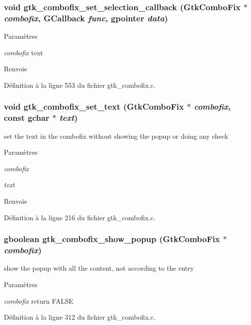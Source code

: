 \subsubsection[{gtk\_\-combofix\_\-set\_\-selection\_\-callback}]{\setlength{\rightskip}{0pt plus 5cm}void gtk\_\-combofix\_\-set\_\-selection\_\-callback ({\bf GtkComboFix} $\ast$ {\em combofix}, \/  GCallback {\em func}, \/  gpointer {\em data})}\label{gtk__combofix_8h_aaaedc2affe02e18b822ef9b59254334c}

\begin{DoxyParams}{Paramètres}
\item[{\em combofix}]text\end{DoxyParams}
\begin{DoxyReturn}{Renvoie}

\end{DoxyReturn}


Définition à la ligne 553 du fichier gtk\_\-combofix.c.

\subsubsection[{gtk\_\-combofix\_\-set\_\-text}]{\setlength{\rightskip}{0pt plus 5cm}void gtk\_\-combofix\_\-set\_\-text ({\bf GtkComboFix} $\ast$ {\em combofix}, \/  const gchar $\ast$ {\em text})}\label{gtk__combofix_8h_ac041b5bd83117286152eb388569f137d}
set the text in the combofix without showing the popup or doing any check


\begin{DoxyParams}{Paramètres}
\item[{\em combofix}]\item[{\em text}]\end{DoxyParams}
\begin{DoxyReturn}{Renvoie}

\end{DoxyReturn}


Définition à la ligne 216 du fichier gtk\_\-combofix.c.

\subsubsection[{gtk\_\-combofix\_\-show\_\-popup}]{\setlength{\rightskip}{0pt plus 5cm}gboolean gtk\_\-combofix\_\-show\_\-popup ({\bf GtkComboFix} $\ast$ {\em combofix})}\label{gtk__combofix_8h_a39a306b39734cda29d4ba4dddd589a26}
show the popup with all the content, not according to the entry


\begin{DoxyParams}{Paramètres}
\item[{\em combofix}]return FALSE \end{DoxyParams}


Définition à la ligne 312 du fichier gtk\_\-combofix.c.

